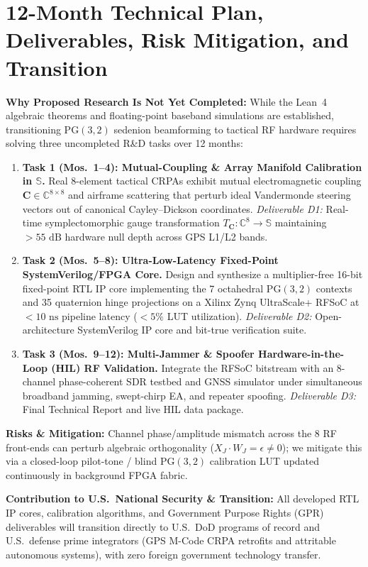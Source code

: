 \documentclass[12pt,letterpaper]{article}
\begin{document}
\section{12-Month Technical Plan, Deliverables, Risk Mitigation, and Transition}
\textbf{Why Proposed Research Is Not Yet Completed:} While the Lean~4 algebraic theorems and floating-point baseband simulations are established, transitioning $\mathrm{PG}(3,2)$ sedenion beamforming to tactical RF hardware requires solving three uncompleted R\&D tasks over 12 months:
\begin{enumerate}[leftmargin=16pt,itemsep=1pt,topsep=1pt]
    \item \textbf{Task 1 (Mos.\ 1--4): Mutual-Coupling \& Array Manifold Calibration in $\mathbb{S}$.} Real 8-element tactical CRPAs exhibit mutual electromagnetic coupling $\mathbf{C} \in \mathbb{C}^{8\times 8}$ and airframe scattering that perturb ideal Vandermonde steering vectors out of canonical Cayley--Dickson coordinates. \textit{Deliverable D1:} Real-time symplectomorphic gauge transformation $T_{\mathbf{C}}: \mathbb{C}^8 \to \mathbb{S}$ maintaining $>55\text{ dB}$ hardware null depth across GPS L1/L2 bands.
    \item \textbf{Task 2 (Mos.\ 5--8): Ultra-Low-Latency Fixed-Point SystemVerilog/FPGA Core.} Design and synthesize a multiplier-free 16-bit fixed-point RTL IP core implementing the 7 octahedral $\mathrm{PG}(3,2)$ contexts and 35 quaternion hinge projections on a Xilinx Zynq UltraScale+ RFSoC at $<10\text{ ns}$ pipeline latency ($<5\%$ LUT utilization). \textit{Deliverable D2:} Open-architecture SystemVerilog IP core and bit-true verification suite.
    \item \textbf{Task 3 (Mos.\ 9--12): Multi-Jammer \& Spoofer Hardware-in-the-Loop (HIL) RF Validation.} Integrate the RFSoC bitstream with an 8-channel phase-coherent SDR testbed and GNSS simulator under simultaneous broadband jamming, swept-chirp EA, and repeater spoofing. \textit{Deliverable D3:} Final Technical Report and live HIL data package.
\end{enumerate}
\textbf{Risks \& Mitigation:} Channel phase/amplitude mismatch across the 8 RF front-ends can perturb algebraic orthogonality ($X_J \cdot W_J = \epsilon \neq 0$); we mitigate this via a closed-loop pilot-tone / blind $\mathrm{PG}(3,2)$ calibration LUT updated continuously in background FPGA fabric.

\textbf{Contribution to U.S.\ National Security \& Transition:} All developed RTL IP cores, calibration algorithms, and Government Purpose Rights (GPR) deliverables will transition directly to U.S.\ DoD programs of record and U.S.\ defense prime integrators (GPS M-Code CRPA retrofits and attritable autonomous systems), with zero foreign government technology transfer.
\end{document}
